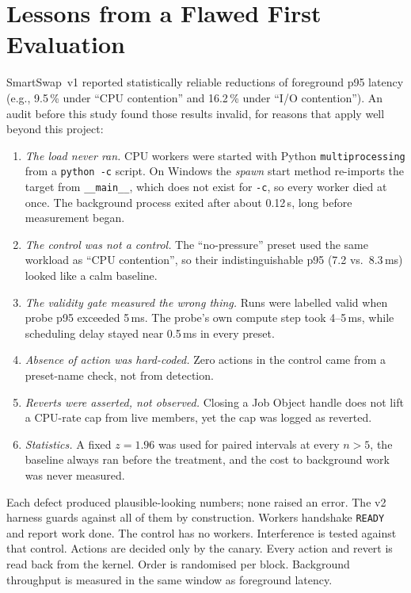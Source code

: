 \section{Lessons from a Flawed First Evaluation}
\label{sec:lessons}

SmartSwap~v1 reported statistically reliable reductions of foreground p95 latency (e.g., 9.5\,\% under ``CPU contention'' and 16.2\,\% under ``I/O contention''). An audit before this study found those results invalid, for reasons that apply well beyond this project:
\begin{enumerate}
\item \emph{The load never ran.} CPU workers were started with Python \texttt{multiprocessing} from a \texttt{python -c} script. On Windows the \emph{spawn} start method re-imports the target from \texttt{\_\_main\_\_}, which does not exist for \texttt{-c}, so every worker died at once. The background process exited after about 0.12\,s, long before measurement began.
\item \emph{The control was not a control.} The ``no-pressure'' preset used the same workload as ``CPU contention'', so their indistinguishable p95 (7.2 vs.\ 8.3\,ms) looked like a calm baseline.
\item \emph{The validity gate measured the wrong thing.} Runs were labelled valid when probe p95 exceeded 5\,ms. The probe's own compute step took 4--5\,ms, while scheduling delay stayed near 0.5\,ms in every preset.
\item \emph{Absence of action was hard-coded.} Zero actions in the control came from a preset-name check, not from detection.
\item \emph{Reverts were asserted, not observed.} Closing a Job Object handle does not lift a CPU-rate cap from live members, yet the cap was logged as reverted.
\item \emph{Statistics.} A fixed $z=1.96$ was used for paired intervals at every $n>5$, the baseline always ran before the treatment, and the cost to background work was never measured.
\end{enumerate}
Each defect produced plausible-looking numbers; none raised an error. The v2 harness guards against all of them by construction. Workers handshake \texttt{READY} and report work done. The control has no workers. Interference is tested against that control. Actions are decided only by the canary. Every action and revert is read back from the kernel. Order is randomised per block. Background throughput is measured in the same window as foreground latency.
